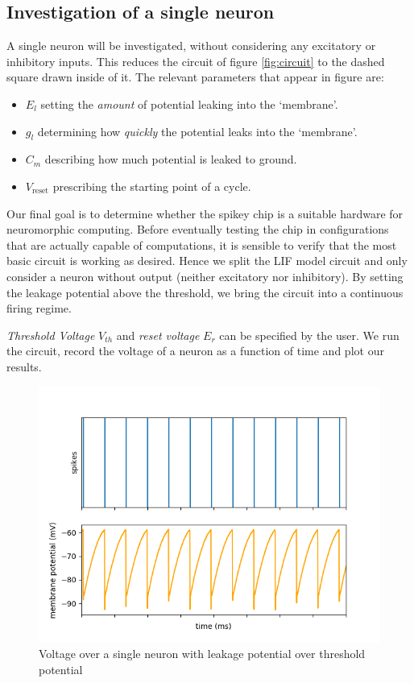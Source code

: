\documentclass[a4paper,twocolumn]{article}
\begin{document}
\subsection{Investigation of a single neuron}
A single neuron will be investigated,  without considering any excitatory or
inhibitory inputs.  This reduces the circuit of figure \ref{fig:circuit}
to the dashed square drawn inside of it. The relevant parameters
that appear in figure are:
\begin{itemize}
    \item $E_l$ setting the \textit{amount} of potential leaking into the `membrane'.
    \item $g_l$ determining how \textit{quickly} the potential leaks into the `membrane'.
    \item $C_m$ describing how much potential is leaked to ground.
    \item $V_\text{reset}$ prescribing the starting point of a cycle.
\end{itemize}

Our final goal is to determine whether the spikey chip is a suitable hardware for
neuromorphic computing.  Before eventually testing the chip in configurations
that are actually capable of computations,  it is sensible to verify that the
most basic circuit is working as desired.  Hence we split the LIF model circuit
and only consider a neuron without output (neither excitatory nor inhibitory).
By setting the leakage potential above the threshold, we bring the circuit into
a continuous firing regime. \par
\textit{Threshold Voltage} $V_{th}$ and \textit{reset voltage} $E_r$ can be
specified by the user.  We run the circuit,  record the voltage of a neuron as
a function of time and plot our results.

\begin{figure}[ht]
    \centering
    \includegraphics[width=.5\textwidth]{figures/fp_task1_1membrane.png}
    \caption{Voltage over a single neuron with leakage potential over threshold potential}
    \label{fig:membranes_ex1}
\end{figure}
\end{document}
